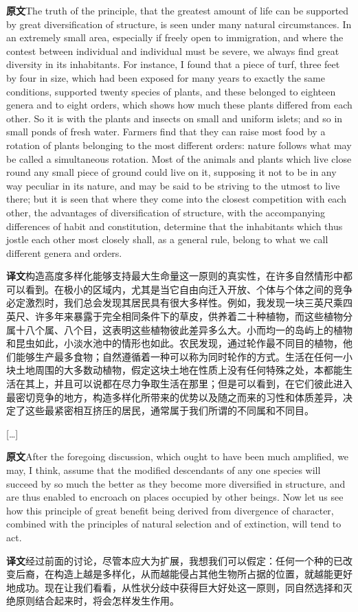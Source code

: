 \documentclass[UTF8,zihao=-4]{ctexart}
\newcommand{\BodyFont}{\fontsize{10.5pt}{15.5pt}\selectfont}
\newcommand{\origlabel}{\textbf{原文}\quad}
\newcommand{\translabel}{\textbf{译文}\quad}
\newenvironment{enblock}{\par\noindent\begingroup\BodyFont\origlabel}{\par\endgroup}
\newenvironment{zhblock}{\par\noindent\begingroup\BodyFont\translabel}{\par\endgroup\vspace{0.35em}}
\newcommand{\pair}[2]{\begin{enblock}#1\end{enblock}\begin{zhblock}#2\end{zhblock}}
\begin{document}
\pair{The truth of the principle, that the greatest amount of life can be supported by great diversification of structure, is seen under many natural circumstances. In an extremely small area, especially if freely open to immigration, and where the contest between individual and individual must be severe, we always find great diversity in its inhabitants. For instance, I found that a piece of turf, three feet by four in size, which had been exposed for many years to exactly the same conditions, supported twenty species of plants, and these belonged to eighteen genera and to eight orders, which shows how much these plants differed from each other. So it is with the plants and insects on small and uniform islets; and so in small ponds of fresh water. Farmers find that they can raise most food by a rotation of plants belonging to the most different orders: nature follows what may be called a simultaneous rotation. Most of the animals and plants which live close round any small piece of ground could live on it, supposing it not to be in any way peculiar in its nature, and may be said to be striving to the utmost to live there; but it is seen that where they come into the closest competition with each other, the advantages of diversification of structure, with the accompanying differences of habit and constitution, determine that the inhabitants which thus jostle each other most closely shall, as a general rule, belong to what we call different genera and orders.}{构造高度多样化能够支持最大生命量这一原则的真实性，在许多自然情形中都可以看到。在极小的区域内，尤其是当它自由向迁入开放、个体与个体之间的竞争必定激烈时，我们总会发现其居民具有很大多样性。例如，我发现一块三英尺乘四英尺、许多年来暴露于完全相同条件下的草皮，供养着二十种植物，而这些植物分属十八个属、八个目，这表明这些植物彼此差异多么大。小而均一的岛屿上的植物和昆虫如此，小淡水池中的情形也如此。农民发现，通过轮作最不同目的植物，他们能够生产最多食物；自然遵循着一种可以称为同时轮作的方式。生活在任何一小块土地周围的大多数动植物，假定这块土地在性质上没有任何特殊之处，本都能生活在其上，并且可以说都在尽力争取生活在那里；但是可以看到，在它们彼此进入最密切竞争的地方，构造多样化所带来的优势以及随之而来的习性和体质差异，决定了这些最紧密相互挤压的居民，通常属于我们所谓的不同属和不同目。}

\begin{center}
[\ldots]
\end{center}

\pair{After the foregoing discussion, which ought to have been much amplified, we may, I think, assume that the modified descendants of any one species will succeed by so much the better as they become more diversified in structure, and are thus enabled to encroach on places occupied by other beings. Now let us see how this principle of great benefit being derived from divergence of character, combined with the principles of natural selection and of extinction, will tend to act.}{经过前面的讨论，尽管本应大为扩展，我想我们可以假定：任何一个种的已改变后裔，在构造上越是多样化，从而越能侵占其他生物所占据的位置，就越能更好地成功。现在让我们看看，从性状分歧中获得巨大好处这一原则，同自然选择和灭绝原则结合起来时，将会怎样发生作用。}
\end{document}
